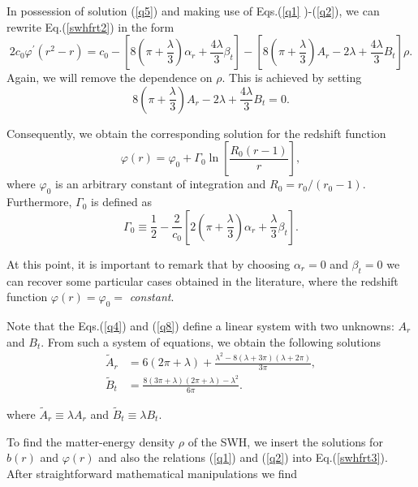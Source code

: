\documentclass[aps,preprint,onecolumn,11pt,showkeys]{revtex4}%
\begin{document}
In possession of solution (\ref{q5}) and making use of Eqs.(\ref{q1}%
)-(\ref{q2}), we can rewrite Eq.(\ref{swhfrt2}) in the form%
\begin{equation}
2c_{0}\varphi^{\prime}(r^{2}-r)=c_{0}-\left[  8\left(  \pi+\frac{\lambda}%
{3}\right)  \alpha_{r}+\frac{4\lambda}{3}\beta_{t}\right]  -\left[  8\left(
\pi+\frac{\lambda}{3}\right)  A_{r}-2\lambda+\frac{4\lambda}{3}B_{t}\right]
\rho. \label{q7.1}%
\end{equation}
Again, we will remove the dependence on $\rho$. This is achieved by setting%
\begin{equation}
8\left(  \pi+\frac{\lambda}{3}\right)  A_{r}-2\lambda+\frac{4\lambda}{3}%
B_{t}=0. \label{q8}%
\end{equation}

Consequently, we obtain the corresponding solution for the redshift function%
\begin{equation}
\varphi(r)=\varphi_{0}+\Gamma_{0}\ln\left[  \frac{R_{0}\left(  r-1\right)
}{r}\right]  , \label{q9}%
\end{equation}
\noindent where $\varphi_{0}$ is an arbitrary constant of integration and
$R_{0}=r_{0}/(r_{0}-1)$. Furthermore, $\Gamma_{0}$ is defined as%
\begin{equation}
\Gamma_{0}\equiv\frac{1}{2}-\frac{2}{c_{0}}\left[  2\left(  \pi+\frac{\lambda
}{3}\right)  \alpha_{r}+\frac{\lambda}{3}\beta_{t}\right]  . \label{q10}%
\end{equation}

At this point, it is important to remark that by choosing $\alpha_{r}=0$ and
$\beta_{t}=0$ we can recover some particular cases obtained in the literature,
where the redshift function $\varphi(r)=\varphi_{0}=$ \textit{constant}.

Note that the Eqs.(\ref{q4}) and (\ref{q8}) define a linear system with two
unknowns: $A_{r}$ and $B_{t}$. From such a system of equations, we obtain the
following solutions%
\begin{align}
\tilde{A}_{r}  &  =6\left(  2\pi+\lambda\right)  +\frac{\lambda^{2}-8\left(
\lambda+3\pi\right)  \left(  \lambda+2\pi\right)  }{3\pi},\label{q11}\\
\tilde{B}_{t}  &  =\frac{8\left(  3\pi+\lambda\right)  \left(  2\pi
+\lambda\right)  -\lambda^{2}}{6\pi}. \label{q12}%
\end{align}

\noindent where $\tilde{A}_{r}\equiv\lambda A_{r}$ and
$\tilde{B}_{t}\equiv\lambda B_{t}.$

To find the matter-energy density $\rho$ of the SWH, we insert the solutions
for $b(r)$ and $\varphi(r)$ and also the relations (\ref{q1}) and (\ref{q2})
into Eq.(\ref{swhfrt3}). After straightforward mathematical manipulations we find%
\end{document}
